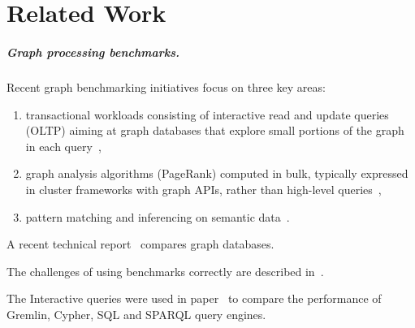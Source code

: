 \chapter{Related Work}
\label{section:related-work}


\paragraph*{Graph processing benchmarks.}

Recent graph benchmarking initiatives focus on three key areas:

\begin{enumerate}
\item transactional workloads consisting of interactive read and update queries (OLTP) aiming at graph databases that explore small portions of the graph in each query~\cite{DBLP:conf/cidr/BarahmandG13,DBLP:conf/sigmod/ArmstrongPBC13,DBLP:journals/ase/DayarathnaS14,DBLP:conf/sigmod/ErlingALCGPPB15,DBLP:journals/pvldb/LissandriniBV18},
\item graph analysis algorithms (\eg PageRank) computed in bulk, typically expressed in cluster frameworks with graph APIs, rather than high-level queries~\cite{DBLP:conf/hipc/BaderM05,DBLP:conf/bigdataconf/ElserM13,DBLP:conf/sc/NaiXTKL15,DBLP:journals/pvldb/IosupHNHPMCCSAT16},
\item pattern matching and inferencing on semantic data~\cite{DBLP:journals/ws/GuoPH05,DBLP:books/sp/virgilio09/SchmidtHMPL09,DBLP:conf/semweb/MorseyLAN11,DBLP:conf/semweb/AlucHOD14,DBLP:journals/sosym/SzarnyasIRV18}.
\end{enumerate}

A recent technical report~\cite{lissandrini17} compares graph databases.

The challenges of using benchmarks correctly are described in~\cite{DBLP:conf/sigmod/RaasveldtHGM18}.

The Interactive queries were used in paper~\cite{DBLP:conf/grades/PacaciZLO17} to compare the performance of Gremlin, Cypher, SQL and SPARQL query engines.


